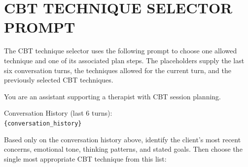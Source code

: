 \chapter{CBT TECHNIQUE SELECTOR PROMPT}
\label{app:cbt-selector-prompt}
\resumetocwriting

The CBT technique selector uses the following prompt to choose one allowed technique and one of its associated plan steps. The placeholders supply the last six conversation turns, the techniques allowed for the current turn, and the previously selected CBT techniques.

\begin{tcolorbox}[
    breakable,
    colback=gray!10,
    colframe=gray!40,
    boxrule=0.5pt,
    arc=3mm,
    left=4mm, right=4mm, top=3mm, bottom=3mm
]
\small
\raggedright
You are an assistant supporting a therapist with CBT session planning.

Conversation History (last 6 turns):\\
\texttt{\{conversation\_history\}}

Based only on the conversation history above, identify the client's most recent concerns, emotional tone, thinking patterns, and stated goals. Then choose the single most appropriate CBT technique from this list:


\end{tcolorbox}
